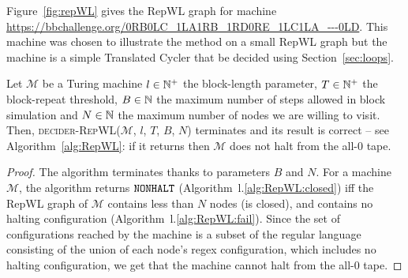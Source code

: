 \begin{example}
    Figure~\ref{fig:repWL} gives the RepWL graph for machine \url{https://bbchallenge.org/0RB0LC_1LA1RB_1RD0RE_1LC1LA_---0LD}. This machine was chosen to illustrate the method on a small RepWL graph but the machine is a simple Translated Cycler that be decided using Section~\ref{sec:loops}.
\end{example}


\begin{theorem}\label{th:repwl}
    Let $\mathcal{M}$ be a Turing machine $l\in \mathbb{N}^+$ the block-length parameter, $T \in \mathbb{N}^+$ the block-repeat threshold, $B \in \mathbb{N}$ the maximum number of steps allowed in block simulation and $N \in \mathbb{N}$ the maximum number of nodes we are willing to visit. Then, \textsc{decider-RepWL}($\mathcal{M}$, $l$, $T$, $B$, $N$) terminates and its result is correct -- see Algorithm~\ref{alg:RepWL}: if it returns \NONHALT then $\mathcal{M}$ does not halt from the all-$0$ tape.
\end{theorem}
\begin{proof}
    The algorithm terminates thanks to parameters $B$ and $N$. For a machine $\mathcal{M}$, the algorithm returns $\texttt{NONHALT}$ (Algorithm~l.\ref{alg:RepWL:closed}) iff the RepWL graph of $\mathcal{M}$ contains less than $N$ nodes (\ie is closed), and contains no halting configuration (Algorithm~l.\ref{alg:RepWL:fail}). Since the set of configurations reached by the machine is a subset of the regular language consisting of the union of each node's regex configuration, which includes no halting configuration, we get that the machine cannot halt from the all-0 tape.
\end{proof}


